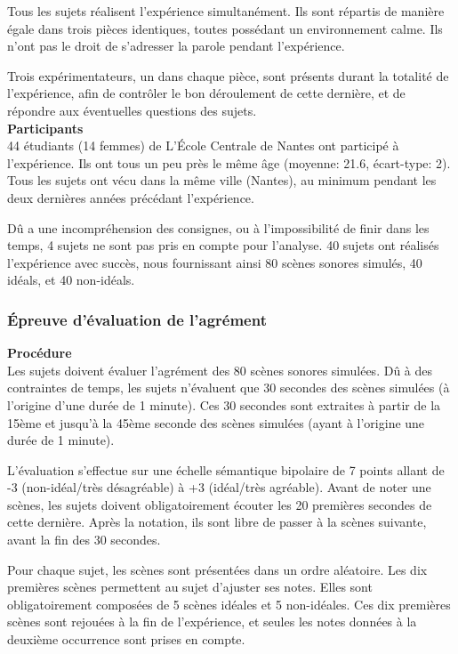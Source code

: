 Tous les sujets réalisent l'expérience simultanément. Ils sont répartis de manière égale dans trois pièces identiques, toutes possédant un environnement calme. Ils n'ont pas le droit de s'adresser la parole pendant l'expérience.

Trois expérimentateurs, un dans chaque pièce, sont présents durant la totalité de l'expérience, afin de contrôler le bon déroulement de cette dernière, et de répondre aux éventuelles questions des sujets.  \\

\textbf{Participants} \\

44 étudiants (14 femmes) de L’École Centrale de Nantes ont participé à l'expérience. Ils ont tous un peu près le même âge (moyenne: 21.6, écart-type: 2). Tous les sujets ont vécu dans la même ville (Nantes), au minimum pendant les deux dernières années précédant l'expérience.

Dû a une incompréhension des consignes, ou à l'impossibilité de finir dans les temps, 4 sujets ne sont pas pris en compte pour l'analyse. 40 sujets ont réalisés l'expérience avec succès, nous fournissant ainsi 80 scènes sonores simulés, 40 idéals, et 40 non-idéals.

\subsubsection{Épreuve d'évaluation de l'agrément}
\label{sec:ch5_planExpEvaA}

\textbf{Procédure} \\

Les sujets doivent évaluer l'agrément des 80 scènes sonores simulées. Dû à des contraintes de temps, les sujets n'évaluent que 30 secondes des scènes simulées (à l'origine d'une durée de 1 minute). Ces 30 secondes sont extraites à partir de la 15ème et jusqu'à la 45ème seconde des scènes simulées (ayant à l'origine une durée de 1 minute).

L'évaluation s'effectue sur une échelle sémantique bipolaire de 7 points allant de -3 (non-idéal/très désagréable) à +3 (idéal/très agréable). Avant de noter une scènes, les sujets doivent obligatoirement écouter les 20 premières secondes de cette dernière. Après la notation, ils sont libre de passer à la scènes suivante, avant la fin des 30 secondes.

Pour chaque sujet, les scènes sont présentées dans un ordre aléatoire. Les dix premières scènes permettent au sujet d'ajuster ses notes. Elles sont obligatoirement composées de 5 scènes idéales et 5 non-idéales. Ces dix premières scènes sont rejouées à la fin de l'expérience, et seules les notes données à la deuxième occurrence sont prises en compte. \\

